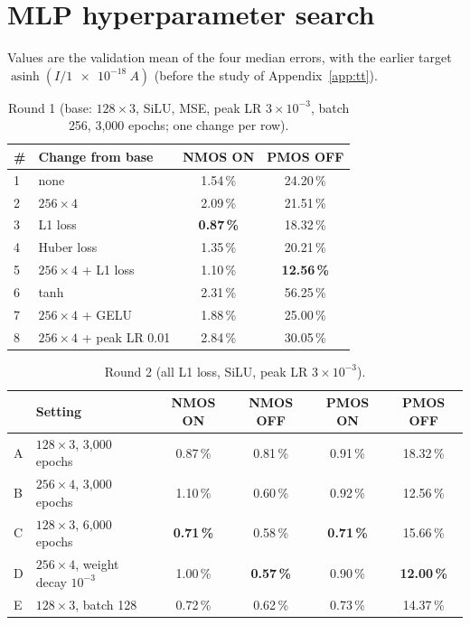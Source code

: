 \documentclass[11pt,a4paper]{article}
\begin{document}
\appendix
\section{MLP hyperparameter search}
\label{app:mlp}
Values are the validation mean of the four median errors, with the earlier target
$\operatorname{asinh}(I/\SI{1e-18}{A})$ (before the study of Appendix~\ref{app:tt}).

\begin{table}[!htbp]
\centering
\small
\caption{Round 1 (base: $128\times3$, SiLU, MSE, peak LR $3\times10^{-3}$, batch 256, 3,000 epochs; one change per row).}
\begin{tabular}{llcc}
\toprule
\# & Change from base & NMOS ON & PMOS OFF \\
\midrule
1 & none                      & 1.54\,\% & 24.20\,\% \\
2 & $256\times4$              & 2.09\,\% & 21.51\,\% \\
3 & L1 loss                   & \textbf{0.87\,\%} & 18.32\,\% \\
4 & Huber loss                & 1.35\,\% & 20.21\,\% \\
5 & $256\times4$ + L1 loss    & 1.10\,\% & \textbf{12.56\,\%} \\
6 & tanh                      & 2.31\,\% & 56.25\,\% \\
7 & $256\times4$ + GELU       & 1.88\,\% & 25.00\,\% \\
8 & $256\times4$ + peak LR 0.01 & 2.84\,\% & 30.05\,\% \\
\bottomrule
\end{tabular}
\end{table}

\begin{table}[!htbp]
\centering
\small
\caption{Round 2 (all L1 loss, SiLU, peak LR $3\times10^{-3}$).}
\begin{tabular}{llcccc}
\toprule
 & Setting & NMOS ON & NMOS OFF & PMOS ON & PMOS OFF \\
\midrule
A & $128\times3$, 3,000 epochs          & 0.87\,\% & 0.81\,\% & 0.91\,\% & 18.32\,\% \\
B & $256\times4$, 3,000 epochs          & 1.10\,\% & 0.60\,\% & 0.92\,\% & 12.56\,\% \\
C & $128\times3$, 6,000 epochs          & \textbf{0.71\,\%} & 0.58\,\% & \textbf{0.71\,\%} & 15.66\,\% \\
D & $256\times4$, weight decay $10^{-3}$ & 1.00\,\% & \textbf{0.57\,\%} & 0.90\,\% & \textbf{12.00\,\%} \\
E & $128\times3$, batch 128             & 0.72\,\% & 0.62\,\% & 0.73\,\% & 14.37\,\% \\
\bottomrule
\end{tabular}
\end{table}
\end{document}
